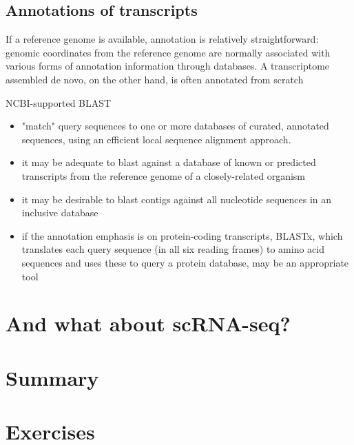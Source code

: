 \documentclass{beamer}\usepackage[]{graphicx}\usepackage[]{color}
\begin{document}
\subsection{Annotations of transcripts}
\begin{frame}
\begin{displayquote}
\footnotesize
If a reference genome is available, annotation is relatively straightforward:  genomic coordinates from the reference genome are normally associated with various forms of annotation information through databases. A transcriptome assembled de novo, on the other hand, is often annotated from scratch
\end{displayquote}
\begin{block}{NCBI-supported BLAST}
\begin{itemize}
\footnotesize
  \item "match" query sequences to one or more databases of curated, annotated sequences, using an efficient local sequence alignment approach.
  \item it may be adequate to blast against a database of known or predicted transcripts from the reference genome of a closely-related organism
  \item it may be desirable to blast contigs against all nucleotide sequences in an inclusive database
  \item if the annotation emphasis is on protein-coding transcripts, BLASTx, which translates each query sequence (in all six reading frames) to amino acid sequences and uses these to query a protein database, may be an appropriate tool
\end{itemize}
\end{block}
\end{frame}

\section{And what about scRNA-seq?}
\section{Summary}

\section{Exercises}
\end{document}
